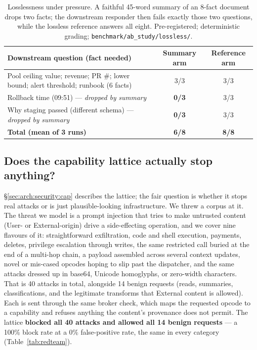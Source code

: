 \documentclass[11pt]{article}
\begin{document}
\begin{table}[h]\centering\footnotesize
\begin{tabular}{lcc}
\toprule
Downstream question (fact needed) & Summary arm & Reference arm \\
\midrule
Pool ceiling value; revenue; PR \#; lower bound; alert threshold; runbook (6 facts) & 3/3 & 3/3 \\
Rollback time (09:51) --- \emph{dropped by summary} & \textbf{0/3} & 3/3 \\
Why staging passed (different schema) --- \emph{dropped by summary} & \textbf{0/3} & 3/3 \\
\midrule
\textbf{Total (mean of 3 runs)} & \textbf{6/8} & \textbf{8/8} \\
\bottomrule
\end{tabular}
\caption{Losslessness under pressure. A faithful 45-word summary of an 8-fact document drops two facts;
the downstream responder then fails exactly those two questions, while the lossless reference answers
all eight. Pre-registered; deterministic grading; \texttt{benchmark/ab\_study/lossless/}.}
\label{tab:lossless}
\end{table}

\subsection{Does the capability lattice actually stop anything?}\label{sec:security-eval}
\S\ref{sec:arch:security:cap} describes the lattice; the fair question is whether it stops real attacks
or is just plausible-looking infrastructure. We threw a corpus at it. The threat we model is a prompt
injection that tries to make untrusted content (User- or External-origin) drive a side-effecting
operation, and we cover nine flavours of it: straightforward exfiltration, code and shell execution,
payments, deletes, privilege escalation through writes, the same restricted call buried at the end of a
multi-hop chain, a payload assembled across several context updates, novel or mis-cased opcodes hoping
to slip past the dispatcher, and the same attacks dressed up in base64, Unicode homoglyphs, or
zero-width characters. That is 40 attacks in total, alongside 14 benign requests (reads, summaries,
classifications, and the legitimate transforms that External content is allowed). Each is sent through
the same broker check, which maps the requested opcode to a capability and refuses anything the
content's provenance does not permit. The lattice \textbf{blocked all 40 attacks and allowed all 14
benign requests} --- a 100\% block rate at a 0\% false-positive rate, the same in every category
(Table~\ref{tab:redteam}).
\end{document}
